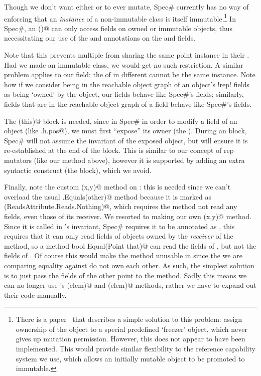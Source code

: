 Though we don't want either \Q@pos@ or \Q@path@ to ever mutate, Spec\# currently has no way of enforcing that an \emph{instance} of a non-immutable class is itself immutable.\footnote{There is a paper~\cite{DBLP:conf/vstte/LeinoMW08} that describes a simple solution to this problem: assign ownership of the object to a special predefined `freezer' object, which never gives up mutation permission. However, this does not appear to have been implemented. This would provide similar flexibility to the reference capability system we use, which allows an initially mutable object to be promoted to immutable.} In Spec\#, an \Q@invariant()@ can only access fields on owned or immutable objects, thus necessitating our use of the \Q@Peer@ and \Q@Rep@ annotations on the \Q@pos@ and \Q@path@ fields.

Note that this prevents multiple \Q@Cage@s from sharing the same point instance in their \Q@path@.
Had we made \Q@Point@ an immutable class, we would get no such restriction. A similar problem applies to our \Q@pos@ field: the \Q@pos@ of \Q@Hamster@s in different  \Q@Cage@s cannot be the same \Q@Point@ instance.
Note how if we consider being in the reachable object graph of an object's \Q!rep! fields as being `owned' by the object, our \Q@rep@ fields behave like Spec\#'s \Q@Rep@ fields; similarly, \Q@mut@ fields that are in the reachable object graph of a \Q@rep@ field behave like Spec\#'s \Q@Peer@ fields.

The \Q@expose(this)@ block is needed, since in Spec\# in order to modify a field of an object (like \Q@this.h.pos@), we must first ``expose'' its owner (the \Q@Cage@). During an \Q@expose@ block, Spec\# will not assume the invariant of the exposed object, but will ensure it is re-established at the end of the block. This is similar to our concept of rep mutators (like our \Q@moveTo@ method above), however it is supported by adding an extra syntactic construct (the \Q@expose@ block), which we avoid.

Finally, note the custom \Q@Equal(x,y)@ method on \Q@Point@: this is needed since we can't overload the usual \Q@Object.Equals(other)@ method because it is marked as \Q@Reads(ReadsAttribute.Reads.Nothing)@, which requires the method not read any fields, even those of its receiver.
We resorted to making our own \Q@Equal(x,y)@ method. Since it is called in \Q@Cage@'s invariant, Spec\# requires it to be annotated as \Q@Pure@, this requires that it can only read fields of objects owned by the \emph{receiver} of the method, so a method \Q@[Pure] bool Equal(Point that)@ can read the fields of \Q@this@, but not the fields of \Q@that@. Of course this would make the method unusable in \Q@Cage@ since the \Q@Point@s we are comparing equality against do not own each other. As such, the simplest solution is to just pass the fields of the other point to the method.
Sadly this means we can no longer use \Q@List@'s \Q@Contains(elem)@ and \Q@IndexOf(elem)@ methods, rather we have to expand out their code manually.

